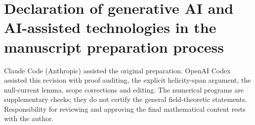\section*{Declaration of generative AI and AI-assisted technologies in the manuscript preparation process}

Claude Code (Anthropic) assisted the original preparation. OpenAI Codex assisted this revision with proof auditing, the explicit helicity-span argument, the null-current lemma, scope corrections and editing. The numerical programs are supplementary checks; they do not certify the general field-theoretic statements. Responsibility for reviewing and approving the final mathematical content rests with the author.

